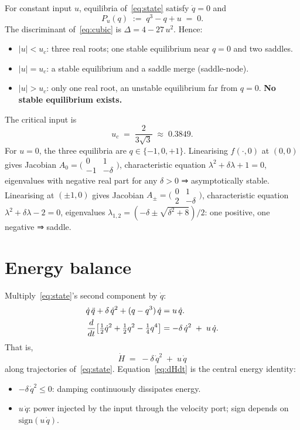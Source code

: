\documentclass[11pt]{article}
\begin{document}
For constant input $u$, equilibria of~\eqref{eq:state} satisfy
$\dot q = 0$ and
\begin{equation}
P_u(q) \;:=\; q^3 - q + u \;=\; 0.
\label{eq:cubic}
\end{equation}
The discriminant of~\eqref{eq:cubic} is $\Delta = 4 - 27\,u^2$. Hence:
\begin{itemize}
\item $|u| < u_c$: three real roots; one stable equilibrium near
      $q=0$ and two saddles.
\item $|u| = u_c$: a stable equilibrium and a saddle merge
      (saddle-node).
\item $|u| > u_c$: only one real root, an unstable equilibrium far
      from $q=0$. {\bfseries No stable equilibrium exists.}
\end{itemize}
The critical input is
\begin{equation}
u_c \;=\; \frac{2}{3\sqrt{3}} \;\approx\; 0.3849.
\label{eq:uc}
\end{equation}
For $u=0$, the three equilibria are $q\in\{-1,0,+1\}$. Linearising
$f(\cdot, 0)$ at $(0,0)$ gives Jacobian
\(
A_0 = \bigl(\begin{smallmatrix} 0 & 1 \\ -1 & -\delta \end{smallmatrix}\bigr)
\),
characteristic equation $\lambda^2 + \delta\lambda + 1 = 0$, eigenvalues
with negative real part for any $\delta > 0$ ⇒ asymptotically stable.
Linearising at $(\pm 1, 0)$ gives Jacobian
\(
A_{\pm} = \bigl(\begin{smallmatrix} 0 & 1 \\ 2 & -\delta \end{smallmatrix}\bigr)
\),
characteristic equation $\lambda^2 + \delta\lambda - 2 = 0$,
eigenvalues $\lambda_{1,2} = (-\delta \pm \sqrt{\delta^2 + 8})/2$:
one positive, one negative ⇒ saddle.

\section{Energy balance}

Multiply~\eqref{eq:state}'s second component by $\dot q$:
\begin{align}
\dot q\,\ddot q + \delta\,\dot q^2 + (q - q^3)\,\dot q
   &= u\,\dot q.
\notag\\
\frac{d}{dt}\!\left[\tfrac{1}{2}\dot q^2
       + \tfrac{1}{2}q^2 - \tfrac{1}{4}q^4\right]
   &= -\delta\,\dot q^2 \;+\; u\,\dot q.
\end{align}
That is,
\begin{equation}
\boxed{\;\;
\dot H \;=\; -\delta\,\dot q^2 \;+\; u\,\dot q
\;\;}
\label{eq:dHdt}
\end{equation}
along trajectories of~\eqref{eq:state}. Equation~\eqref{eq:dHdt}
is the central energy identity:
\begin{itemize}
\item $-\delta\,\dot q^2 \le 0$: damping continuously dissipates
      energy.
\item $u\,\dot q$: power injected by the input through the velocity
      port; sign depends on $\mathrm{sign}(u\,\dot q)$.
\end{itemize}
\end{document}

